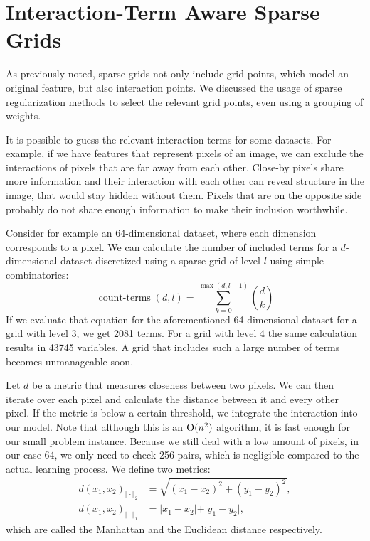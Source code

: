 \section{Interaction-Term Aware Sparse Grids}
As previously noted, sparse grids not only include grid points, which model an original feature, but
also interaction points.
We discussed the usage of sparse regularization methods to select the relevant
grid points, even using a grouping of weights.

It is possible to guess the relevant interaction terms for some datasets.
For example, if we have features that represent pixels of an image, we can
exclude the interactions of pixels that are far away from each other.
Close-by pixels share more information and their interaction with each other can
reveal structure in the image, that would stay hidden without them.
Pixels that are on the opposite side probably do not share enough information to
make their inclusion worthwhile.

Consider for example an 64-dimensional dataset, where each dimension corresponds
to a pixel.
We can calculate the number of included terms for a \(d\)-dimensional dataset
discretized using a sparse grid of level \(l\) using simple combinatorics:
\begin{equation*}
  \operatorname{count-terms}(d, l) = \sum_{k  = 0}^{\max (d, l-1)} \binom{d}{k} 
\end{equation*}
If we evaluate that equation for the aforementioned 64-dimensional dataset for a
grid with level 3, we get 2081 terms.
For a grid with level 4 the same calculation results in 43745 variables.
A grid that includes such a large number of terms becomes unmanageable soon.

Let \(d\) be a metric that measures closeness between two pixels.
We can then iterate over each pixel and calculate the distance between it and
every other pixel.
If the metric is below a certain threshold, we integrate the interaction into our
model.
Note that although this is an \(\operatorname{O}(n^2)\) algorithm, it is fast enough for
our small problem instance.
Because we still deal with a low amount of pixels, in our case 64, we only need
to check 256 pairs, which is negligible compared to the actual learning
process.
We define two metrics:
\begin{align*}
  d(x_1, x_2)_{\Vert \cdot \Vert_2} &= \sqrt{(x_1 - x_2)^2 + (y_1 - y_2)^2},\\
  d(x_1, x_2)_{\Vert \cdot \Vert_1} &= \vert x_1 - x_2 \vert + \vert y_1 - y_2 \vert,
\end{align*}
which are called the Manhattan and the Euclidean distance respectively.

